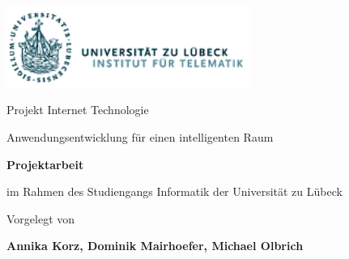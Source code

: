 \begin{titlepage}

  \includegraphics[width=8cm]{figures/ITM-Weblogo.png}

  \vspace{0.8cm}


    \LARGE
    Projekt Internet Technologie

    \vspace{1cm}

    \Large

    Anwendungsentwicklung für einen intelligenten Raum

    \vspace{0.8cm}

    \large

    \textbf{Projektarbeit} 

    im Rahmen des Studiengangs Informatik der Universität zu Lübeck

    \vspace{0.8cm}
    
    Vorgelegt von

    \textbf{Annika Korz, Dominik Mairhoefer, Michael Olbrich}

    \vspace{0.8cm}


\end{titlepage}

